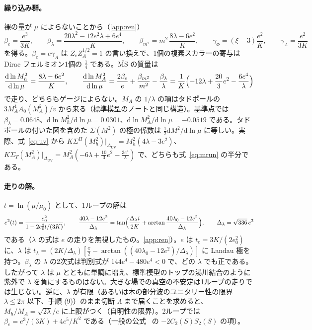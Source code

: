 \documentclass[a4paper,10pt]{ltjsarticle}
\newcommand{\dd}{\mathrm{d}}
\newcommand{\MSbar}{\overline{\mathrm{MS}}}
\newcommand{\DUV}{\Delta_{\mathrm{UV}}}
\begin{document}
\paragraph{繰り込み群。}裸の量が $\mu$ によらないことから（\ref{app:ren}）
\begin{equation}
\beta_e=\frac{e^3}{3K},\qquad
\beta_\lambda=\frac{20\lambda^2-12e^2\lambda+6e^4}K,\qquad
\beta_{m^2}=m^2\,\frac{8\lambda-6e^2}K,\qquad
\gamma_\Phi=(\xi-3)\frac{e^2}K,\qquad
\gamma_A=\frac{e^2}{3K}
\label{eq:rge}
\end{equation}
を得る。$\beta_e=e\gamma_A$ は $Z_eZ_A^{1/2}=1$ の言い換えで、1個の複素スカラーの寄与は Dirac フェルミオン1個の $\frac14$ である。$\MSbar$ の質量は
\begin{equation}
\frac{\dd\ln M_h^2}{\dd\ln\mu}=\frac{8\lambda-6e^2}K,\qquad
\frac{\dd\ln M_A^2}{\dd\ln\mu}=\frac{2\beta_e}e+\frac{\beta_{m^2}}{m^2}-\frac{\beta_\lambda}\lambda=\frac1K\Bigl(-12\lambda+\frac{20}3e^2-\frac{6e^4}\lambda\Bigr)
\label{eq:mrun}
\end{equation}
で走り、どちらもゲージによらない。$M_A$ の $1/\lambda$ の項はタドポールの $3M_A^4A_0(M_A^2)/v$ から来る（標準模型のノートと同じ構造）。基準点では $\beta_\lambda=0.0648$、$\dd\ln M_h^2/\dd\ln\mu=0.0301$、$\dd\ln M_A^2/\dd\ln\mu=-0.0519$ である。タドポールの付いた図を含めた $\Sigma(M^2)$ の極の係数は $\frac12\dd M^2/\dd\ln\mu$ に等しい。実際、式~\eqref{eq:uv} から $K\Sigma^H(M_h^2)|_{\DUV}=M_h^2(4\lambda-3e^2)$、$K\Sigma_T(M_A^2)|_{\DUV}=M_A^2(-6\lambda+\frac{10}3e^2-\frac{3e^4}\lambda)$ で、どちらも式~\eqref{eq:mrun} の半分である。

\paragraph{走りの解。}$t=\ln(\mu/\mu_0)$ として、1ループの解は
\begin{equation}
e^2(t)=\frac{e_0^2}{1-2e_0^2t/(3K)},\qquad
\frac{40\lambda-12e^2}{\Delta_\lambda}=\tan\Bigl(\frac{\Delta_\lambda t}{2K}+\arctan\frac{40\lambda_0-12e^2}{\Delta_\lambda}\Bigr),\qquad
\Delta_\lambda=\sqrt{336}\,e^2
\label{eq:runsol}
\end{equation}
である（$\lambda$ の式は $e$ の走りを無視したもの。\ref{app:ren}）。$e$ は $t_e=3K/(2e_0^2)$ に、$\lambda$ は $t_\lambda=(2K/\Delta_\lambda)[\frac\pi2-\arctan((40\lambda_0-12e^2)/\Delta_\lambda)]$ に Landau 極を持つ。$\beta_\lambda$ の $\lambda$ の2次式は判別式が $144e^4-480e^4<0$ で、どの $\lambda$ でも正である。したがって $\lambda$ は $\mu$ とともに単調に増え、標準模型のトップの湯川結合のように紫外で $\lambda$ を負にするものはない。大きな場での真空の不安定は1ループの走りでは生じない。逆に、$\lambda$ が有限（あるいは木の部分波のユニタリー性の限界 $\lambda\le2\pi$ 以下、手順 (9)）のまま切断 $\Lambda$ まで届くことを求めると、$M_h/M_A=\sqrt{2\lambda}/e$ に上限がつく（自明性の限界）。2ループでは $\beta_e=e^3/(3K)+4e^5/K^2$ である（一般の公式~\cite{mv1} の $-2C_2(S)S_2(S)$ の項）。
\end{document}
